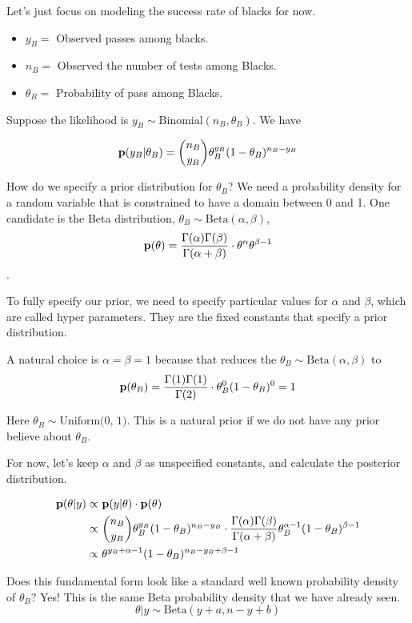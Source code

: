 Let's just focus on modeling the success rate of blacks for now.
\begin{itemize}
    \item $y_B=$ Observed passes among blacks.
    \item $n_B=$ Observed the number of  tests among Blacks.
    \item $\theta_B=$ Probability of pass among Blacks.
\end{itemize}

Suppose the likelihood is  $y_B \sim \text{Binomial}(n_B, \theta_B)$. We have

\[
{\mathbf p}(y_B| \theta_B) = \binom{n_B}{y_B} \theta_B^{y_B} (1-\theta_B)^{n_B - y_B}
\]

How do we specify a prior distribution for $\theta_B$? We need a probability density for a random variable that is constrained to have a domain between 0 and 1. One candidate is the Beta distribution, $\theta_B \sim \text{Beta}(\alpha, \beta)$,
\[
    {\mathbf p}(\theta) = \frac{\Gamma(\alpha) \Gamma(\beta)}{\Gamma(\alpha + \beta)} \cdot \theta^{\alpha} \theta^{\beta-1}
\]. 

To fully specify our prior, we need to specify particular values for $\alpha$ and $\beta$, which are called hyper parameters. They are the fixed constants that specify a prior distribution.

A natural choice is $\alpha = \beta = 1$ because that reduces the $\theta_B \sim \text{Beta}(\alpha, \beta)$ to 
\[
{\mathbf p}(\theta_B) = \frac{\Gamma(1)\Gamma(1)}{\Gamma(2)} \cdot \theta_{B}^0 (1 - \theta_B)^0 = 1
\]

Here $\theta_B \sim \text{Uniform(0, 1)}$. This is  a natural prior if we do not have any prior believe about $\theta_B$.

For now, let's keep $\alpha$ and $\beta$ as unspecified constants, and calculate the posterior distribution.

\begin{align*}
    {\mathbf p}(\theta|y) 
    \propto& ~{\mathbf p}(y| \theta) \cdot {\mathbf p}(\theta)\\
    \propto& ~\binom{n_B}{y_B}\theta_B^{y_B} (1-\theta_B)^{n_B-y_B} \cdot \frac{\Gamma(\alpha)\Gamma(\beta)}{\Gamma(\alpha+\beta)}\theta_B^{\alpha-1} (1 - \theta_B)^{\beta-1}\\
    \propto& ~\theta^{y_B+\alpha-1} (1-\theta_B)^{n_B-y_B+\beta-1}
\end{align*}

Does this fundamental form look like a standard well known probability density of $\theta_B$? Yes! This is the same Beta probability density that we have already seen.
\[
    \theta| y \sim \text{Beta}(y+a, n-y+b)
\]

